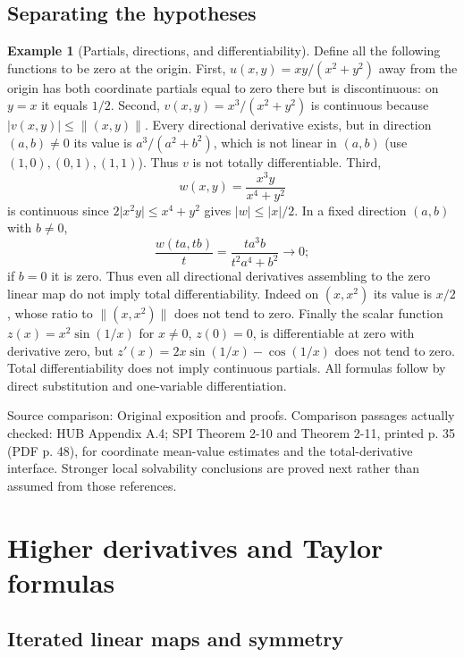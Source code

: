\documentclass[11pt,oneside,openany]{book}
\theoremstyle{definition}
\newtheorem{example}[theorem]{Example}
\theoremstyle{remark}
\newcommand{\abs}[1]{\lvert#1\rvert}
\newcommand{\norm}[1]{\lVert#1\rVert}
\newcommand{\family}[1]{}
\newcommand{\source}[1]{\par\begingroup\small\sffamily\color{black!65}Source comparison: #1\par\endgroup}
\begin{document}
\section{Separating the hypotheses}
\family{K04.02.12}

\begin{example}[Partials, directions, and differentiability]\label{d04:02:counterexamples}
Define all the following functions to be zero at the origin.
First, $u(x,y)=xy/(x^2+y^2)$ away from the origin has both coordinate
partials equal to zero there but is discontinuous: on $y=x$ it equals $1/2$.
Second, $v(x,y)=x^3/(x^2+y^2)$ is continuous because
$\abs{v(x,y)}\leq\norm{(x,y)}$. Every directional derivative exists,
but in direction $(a,b)\ne0$ its value is $a^3/(a^2+b^2)$, which is
not linear in $(a,b)$ (use $(1,0),(0,1),(1,1)$). Thus $v$ is not totally
differentiable. Third,
\[
 w(x,y)=\frac{x^3y}{x^4+y^2}
\]
is continuous since $2\abs{x^2y}\leq x^4+y^2$ gives
$\abs{w}\leq\abs{x}/2$. In a fixed direction $(a,b)$ with $b\ne0$,
\[
 \frac{w(ta,tb)}t=\frac{t a^3b}{t^2a^4+b^2}\longrightarrow0;
\]
if $b=0$ it is zero. Thus even all directional derivatives assembling to
the zero linear map do not imply total differentiability. Indeed on
$(x,x^2)$ its value is $x/2$, whose ratio to $\norm{(x,x^2)}$ does not
tend to zero. Finally the scalar function
$z(x)=x^2\sin(1/x)$ for $x\ne0$, $z(0)=0$, is differentiable at zero
with derivative zero, but $z'(x)=2x\sin(1/x)-\cos(1/x)$ does not tend
to zero. Total differentiability does not imply continuous partials.
All formulas follow by direct substitution and one-variable differentiation.
\end{example}

\source{Original exposition and proofs. Comparison passages actually checked:
HUB Appendix A.4; SPI Theorem 2-10 and Theorem 2-11, printed p. 35
(PDF p. 48), for coordinate mean-value estimates and the total-derivative
interface. Stronger local solvability conclusions are proved next rather
than assumed from those references.}



\chapter{Higher derivatives and Taylor formulas}
\label{ch:d04-03}

\section{Iterated linear maps and symmetry}
\family{K04.03.01}\family{K04.03.02}\family{K04.03.03}\family{K04.03.04}
\end{document}
